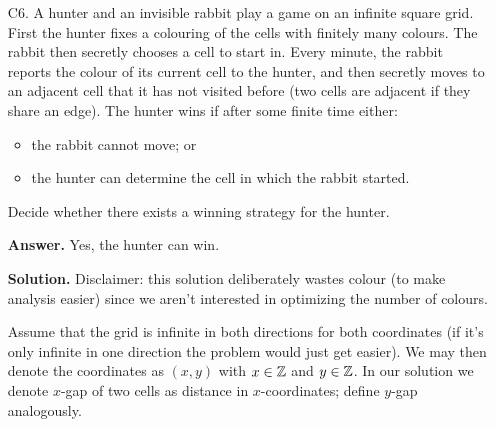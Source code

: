 \documentclass[11pt,a4paper]{article}
\begin{document}
\begin{enumerate}
\begin{proof}
        	Conversely, if we have such a collection of $A\to v_1\Rightarrow v_2\to B$, then these collections have edges disjoint from $A\to v\to B$, so such addition is valid. It therefore means we can pick the collection with maximum number of paths. 
        \end{proof}
        To finish, denote $C_{AB}$ as the quantity described in Lemma \ref{lemma_c4b}. 
        Such paths do not depend on $A$ and $B$ other than that we have in- and out-types of edges, so $C_{AB}=C_{BA}$. 
        Therefore, 
        \[
        N_{AB} = C_{AB} + 1\{A\to B\} + |\{v: \vec{AB}-\text{type}\}|
        \qquad 
        N_{BA} = C_{BA} + 1\{B\to A\} + |\{v: \vec{BA}-\text{type}\}|
        \]
        where $1\{A\to B\}$ means there's a directed edge $A\to B$. 
	    so $N_{AB}-N_{BA} = 1\{A\to B\} + |\{v: \vec{AB}-\text{type}\}| - (1\{B\to A\} + |\{v: \vec{BA}-\text{type}\}|)$. 
	    Given also that the out degree of $A$, $\text{out}(A)$ is given by 
	    $1\{A\to B\} + |\{v: \vec{AB}-\text{type}\}| + |\{v: \text{out-type}\}|$, 
	    we have 
	    \[
	    N_{AB} - N_{BA} = \text{out}(A) - \text{out}(B)
	    \]
	    as desired. 
	    
	    \item [C6.]
	    A hunter and an invisible rabbit play a game on an infinite square grid. First the hunter fixes a colouring of the cells with finitely many colours. The rabbit then secretly chooses a cell to start in. Every minute, the rabbit reports the colour of its current cell to the hunter, and then secretly moves to an adjacent cell that it has not visited before (two cells are adjacent if they share an edge). The hunter wins if after some finite time either:
	    \begin{itemize}
	    	\item the rabbit cannot move; or
	    	
	    	\item the hunter can determine the cell in which the rabbit started.
	    \end{itemize}
	    
	    Decide whether there exists a winning strategy for the hunter.
	    
	    \textbf{Answer.} Yes, the hunter can win. 
	    
	    \textbf{Solution.} 
	    Disclaimer: this solution deliberately wastes colour (to make analysis easier) since we aren't interested in optimizing the number of colours. 
	    
	    Assume that the grid is infinite in both directions for both coordinates 
	    (if it's only infinite in one direction the problem would just get easier). 
	    We may then denote the coordinates as $(x, y)$ with $x\in{\mathbb Z}$ and $y\in{\mathbb Z}$. 
	    In our solution we denote $x$-gap of two cells as distance in $x$-coordinates; 
	    define $y$-gap analogously. 
	    

\end{enumerate}
\end{document}
